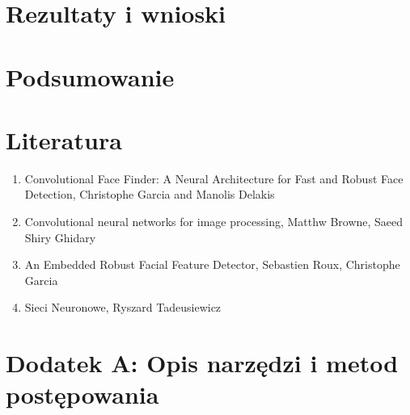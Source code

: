 \documentclass[11pt,a4paper]{article}
\begin{document}
\section{Rezultaty i wnioski}

\section{Podsumowanie}

\section{Literatura}
 \begin{enumerate}
\item Convolutional Face Finder: A Neural Architecture for Fast and Robust Face Detection, Christophe Garcia and Manolis Delakis
\item Convolutional neural networks for image processing, Matthw Browne, Saeed Shiry Ghidary
\item An Embedded Robust Facial Feature Detector, Sebastien Roux, Christophe Garcia
\item Sieci Neuronowe, Ryszard Tadeusiewicz
 \end{enumerate}
\newpage
\section{Dodatek A: Opis narzędzi i metod postępowania}
\end{document}
